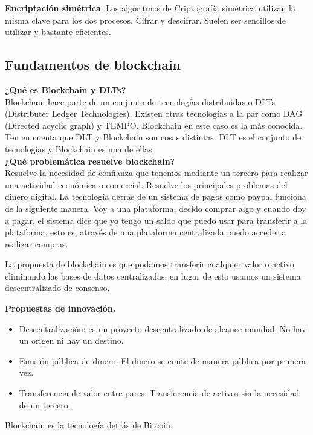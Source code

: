 \documentclass[a4paper,12pt]{/home/armando/Documentos/Cursos/LaTeX/Plantillas/lib/pub}
\begin{document}
\textbf{Encriptación simétrica}: Los algoritmos de Criptografía simétrica utilizan la misma clave para los dos procesos. Cifrar y descifrar. Suelen ser sencillos de utilizar y bastante eficientes.

\subsection{Fundamentos de blockchain}
\textbf{¿Qué es Blockchain y DLTs?}\\
Blockchain hace parte de un conjunto de tecnologías distribuidas o DLTs (Distributer Ledger Technologies). Existen otras tecnologías a la par como DAG (Directed acyclic graph) y TEMPO. Blockchain en este caso es la más conocida. Ten en cuenta que DLT y Blockchain son cosas distintas. DLT es el conjunto de tecnologías y Blockchain es una de ellas.\\

\textbf{¿Qué problemática resuelve blockchain?}\\
Resuelve la necesidad de confianza que tenemos mediante un tercero para realizar una actividad económica o comercial.
Resuelve los principales problemas del dinero digital.
La tecnología detrás de un sistema de pagos como paypal funciona de la siguiente manera. Voy a una plataforma, decido comprar algo y cuando doy a pagar, el sistema dice que yo tengo un saldo que puedo usar para transferir a la plataforma, esto es, através de una plataforma centralizada puedo acceder a realizar compras. 

La propuesta de blockchain es que podamos transferir cualquier valor o activo eliminando las bases de datos centralizadas, en lugar de esto usamos un sistema descentralizado de consenso.

\textbf{Propuestas de innovación.}
\begin{itemize}
	\item Descentralización: es un proyecto descentralizado de alcance mundial. No hay un origen ni hay un destino.
	\item Emisión pública de dinero: El dinero se emite de manera pública por primera vez.
	\item Transferencia de valor entre pares: Transferencia de activos sin la necesidad de un tercero.
\end{itemize}
Blockchain es la tecnología detrás de Bitcoin.
\end{document}
